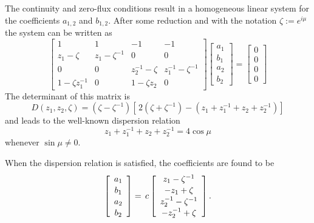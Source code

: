 \documentclass[12pt]{article}
\begin{document}
The continuity and zero-flux conditions result in a homogeneous linear system for the coefficients $a_{1,2}$ and $b_{1,2}$.  After some reduction and with the notation $\zeta:=e^{i\mu}$ the system can be written as
%
\begin{equation}
\renewcommand{\arraystretch}{1.3}
\left[
  \begin{array}{cccc}
    1 & 1 & -1 & -1 \\
    z_1-\zeta & z_1\!-\!\zeta^{-1} & 0 & 0 \\
    0 & 0 & z_2^{-1}\!-\!\zeta & z_1^{-1}\!-\!\zeta^{-1} \\
    1\!-\!\zeta z_1^{-1} & 0 & 1\!-\!\zeta z_2 & 0
  \end{array}
\right]
\left[
  \begin{array}{c}
    a_1 \\ b_1 \\ a_2 \\ b_2
  \end{array}
\right]
=
\left[
  \begin{array}{c}
    0 \\ 0 \\ 0 \\ 0
  \end{array}
\right]
\end{equation}
%
The determinant of this matrix is
%
\begin{equation}
  D(z_1,z_2,\zeta) = (\zeta-\zeta^{-1}) \left[\, 2(\zeta+\zeta^{-1}) - \left( z_1+z_1^{-1} + z_2+z_2^{-1} \right) \right]
\end{equation}
%
and leads to the well-known dispersion relation
%
\begin{equation}
  z_1+z_1^{-1} + z_2+z_2^{-1} = 4\cos\mu
\end{equation}
%
whenever $\sin\mu\not=0$.

When the dispersion relation is satisfied, the coefficients are found to be
%
\begin{equation}\label{coefficients}
  \renewcommand{\arraystretch}{1.1}
\left[
  \begin{array}{c}
      a_1 \\ b_1 \\ a_2 \\ b_2
  \end{array}
\right]
=\,
c \left[
  \begin{array}{c}
      z_1-\zeta^{-1} \\ -z_1 + \zeta \\ z_2^{-1} - \zeta^{-1} \\ -z_2^{-1} + \zeta
  \end{array}
\right].
\end{equation}
%
\end{document}
